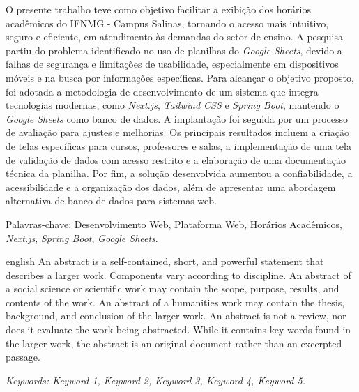 \documentclass[
	12pt,				%
	twoside,			%
	a4paper,			%
	chapter=TITLE,		%
	section=TITLE,		%
	subsection=TITLE,	%
	subsubsection=TITLE,%
	english,			%
	french,				%
	spanish,			%
	brazil,				%
	]{abntex2}
\begin{document}
\begin{resumo}
	O presente trabalho teve como objetivo facilitar a exibição dos horários acadêmicos do IFNMG - Campus Salinas, tornando o acesso mais intuitivo, seguro e eficiente, em atendimento às demandas do setor de ensino. A pesquisa partiu do problema identificado no uso de planilhas do \textit{Google Sheets}, devido a falhas de segurança e limitações de usabilidade, especialmente em dispositivos móveis e na busca por informações específicas. Para alcançar o objetivo proposto, foi adotada a metodologia de desenvolvimento de um sistema que integra tecnologias modernas, como \textit{Next.js}, \textit{Tailwind CSS} e \textit{Spring Boot}, mantendo o \textit{Google Sheets} como banco de dados. A implantação foi seguida por um processo de avaliação para ajustes e melhorias. Os principais resultados incluem a criação de telas específicas para cursos, professores e salas, a implementação de uma tela de validação de dados com acesso restrito e a elaboração de uma documentação técnica da planilha. Por fim, a solução desenvolvida aumentou a confiabilidade, a acessibilidade e a organização dos dados, além de apresentar uma abordagem alternativa de banco de dados para sistemas web.
    
    Palavras-chave: Desenvolvimento Web, Plataforma Web, Horários Acadêmicos,
	\textit{Next.js}, \textit{Spring Boot}, \textit{Google Sheets}.
\end{resumo}

\begin{resumo}[Abstract]
    \begin{otherlanguage*}{english}
        An abstract is a self-contained, short, and powerful statement that describes a larger work. Components vary according to discipline. An abstract of a social science or scientific work may contain the scope, purpose, results, and contents of the work. An abstract of a humanities work may contain the thesis, background, and conclusion of the larger work. An abstract is not a review, nor does it evaluate the work being abstracted. While it contains key words found in the larger work, the abstract is an original document rather than an excerpted passage.

        \textit{Keywords: Keyword 1, Keyword 2, Keyword 3, Keyword 4, Keyword 5.}
    \end{otherlanguage*}
\end{resumo}

\listoffigures*
\cleardoublepage
\end{document}
